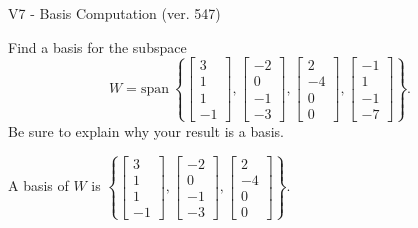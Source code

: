 \begin{exercise}
  \begin{exerciseTitle}V7 - Basis Computation (ver. 547)\end{exerciseTitle}
  \begin{exerciseStatement}
    Find a basis for the subspace 
\[W=\mathrm{span}\ \left\{\left[\begin{array}{r}
3 \\
1 \\
1 \\
-1
\end{array}\right] , \left[\begin{array}{r}
-2 \\
0 \\
-1 \\
-3
\end{array}\right] , \left[\begin{array}{r}
2 \\
-4 \\
0 \\
0
\end{array}\right] , \left[\begin{array}{r}
-1 \\
1 \\
-1 \\
-7
\end{array}\right]\right\}.\]
 Be sure to explain why your result is a basis.


  \end{exerciseStatement}
  \begin{exerciseAnswer}
   A basis of \(W\) is  \(\left\{\left[\begin{array}{r}
3 \\
1 \\
1 \\
-1
\end{array}\right] , \left[\begin{array}{r}
-2 \\
0 \\
-1 \\
-3
\end{array}\right] , \left[\begin{array}{r}
2 \\
-4 \\
0 \\
0
\end{array}\right]\right\}\).
  


  \end{exerciseAnswer}
\end{exercise}